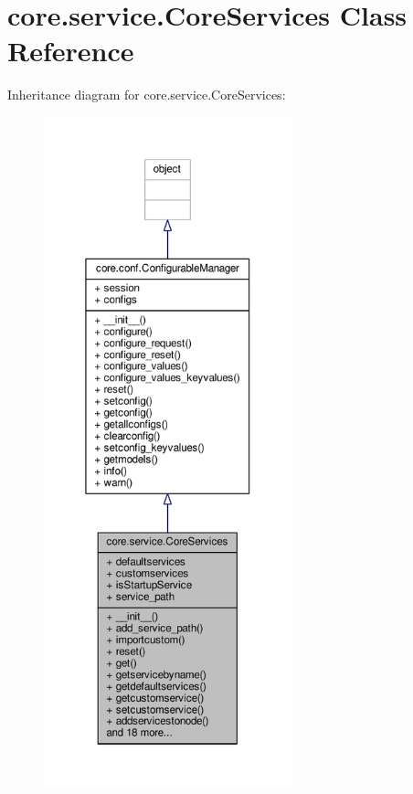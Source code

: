 \hypertarget{classcore_1_1service_1_1_core_services}{\section{core.\+service.\+Core\+Services Class Reference}
\label{classcore_1_1service_1_1_core_services}
}


Inheritance diagram for core.\+service.\+Core\+Services\+:
\nopagebreak
\begin{figure}[H]
\begin{center}
\leavevmode
\includegraphics[height=550pt]{classcore_1_1service_1_1_core_services__inherit__graph}
\end{center}
\end{figure}


